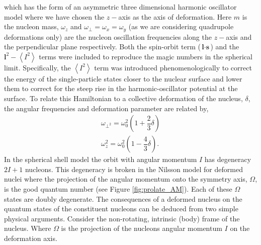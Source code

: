 \documentclass[10pt,a4paper, twoside, openright]{report}
\begin{document}
which has the form of an asymmetric three dimensional harmonic oscillator model where we have chosen the $z-$axis as the axis of deformation. Here $m$ is the nucleon mass, $\omega_z$ and $\omega_{\perp} = \omega_x = \omega_y$ (as we are considering quadrupole deformations only) are the nucleon oscillation frequencies along the $z-$axis and the perpendicular  plane respectively.  Both the spin-orbit term ($\textbf{l}\cdot \textbf{s}$) and the  $\textbf{l}^2 - \left<I^2\right>$ terms were included to reproduce the magic numbers in the spherical limit. Specifically, the $\left<I^2\right>$  term was introduced phenomenologically to correct the energy of the single-particle states closer to the nuclear surface and lower them to correct for the steep rise in the harmonic-oscillator potential at the surface. To relate this Hamiltonian to a collective deformation of the nucleus, $\delta$, the angular frequencies and deformation parameter are related by,
\begin{align*}
\omega_{\perp^{2}} = \omega_0^2\left(1 + \dfrac{2}{3}\delta\right) \\
\omega_z^2 = \omega_0^2\left(1 - \dfrac{4}{3}\delta\right).
\end{align*}
\linebreak
In the spherical shell model the orbit with angular momentum $I$ has degeneracy $2I + 1$ nucleons. This degeneracy is broken in the Nilsson model for deformed nuclei where the projection of the angular momentum onto the symmetry axis, $\Omega$, is the good quantum number (see Figure \ref{fig:prolate_AM}). Each of these $\Omega$ states are doubly degenerate. The consequences of a deformed nucleus on the quantum states of the constituent nucleons can be deduced from two simple physical arguments. Consider the non-rotating, intrinsic (body) frame of the nucleus. Where $\Omega$ is the projection of the nucleons angular momentum $I$ on the deformation axis. 
\end{document}
